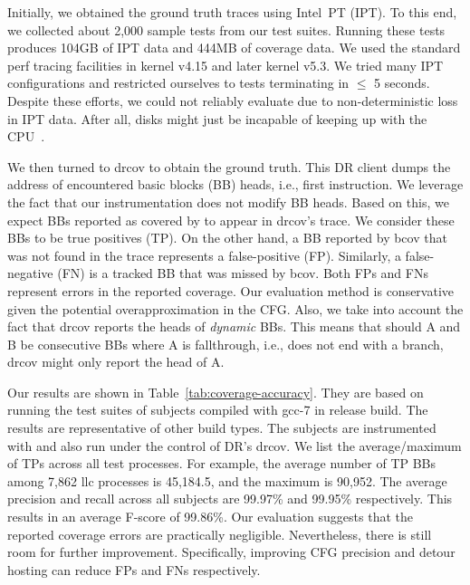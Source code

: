 Initially, we obtained the ground truth traces using Intel~PT (IPT).
To this end, we collected about 2,000 sample tests from our test suites.
Running these tests produces 104GB of IPT data and 444MB of {\bcov} coverage data.
We used the standard \textsf{perf} tracing facilities in kernel v4.15 and later kernel v5.3.
We tried many IPT configurations and restricted ourselves to tests terminating in $ \le $ 5 seconds.
Despite these efforts, we could not reliably evaluate {\bcov} due to non-deterministic loss in IPT data. 
After all, disks might just be incapable of keeping up with the CPU~\cite{IntelPTLinuxDocs}.

We then turned to \textsf{drcov} to obtain the ground truth.
This DR client dumps the address of encountered basic blocks (BB) heads, i.e., first instruction.
We leverage the fact that our instrumentation does not modify BB heads.
Based on this, we expect BBs reported as covered by {\bcov} to appear in \textsf{drcov}'s trace.
We consider these BBs to be true positives (TP).
On the other hand, a BB reported by bcov that was not found in the trace represents a false-positive (FP). 
Similarly, a false-negative (FN) is a tracked BB that was missed by bcov. 
Both FPs and FNs represent errors in the reported coverage. 
Our evaluation method is conservative given the potential overapproximation in the CFG.
Also, we take into account the fact that \textsf{drcov} reports the heads of \textit{dynamic} BBs. 
This means that should A and B be consecutive BBs where A is fallthrough, i.e., does not end with a branch, 
\textsf{drcov} might only report the head of A.


Our results are shown in Table~\ref{tab:coverage-accuracy}.
They are based on running the test suites of subjects compiled with \textsf{gcc-7} in release build.
The results are representative of other build types.
The subjects are instrumented with {\bcov} and also run under the control of DR's \textsf{drcov}.
We list the average/maximum of TPs across all test processes. 
For example, the average number of TP BBs among 7,862 \textsf{llc} processes is 45,184.5, and the maximum is 90,952.
The average precision and recall across all subjects are 99.97\% and 99.95\% respectively.
This results in an average F-score of 99.86\%.
Our evaluation suggests that the reported coverage errors are practically negligible.
Nevertheless, there is still room for further improvement. 
Specifically, improving CFG precision and detour hosting can reduce FPs and FNs respectively. 


